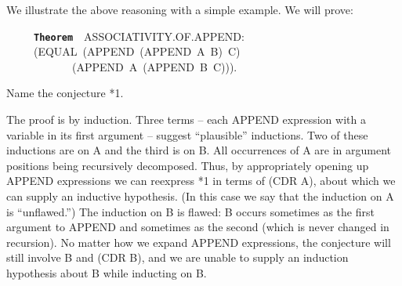 \documentclass[11pt]{book}
\newenvironment{pubasis}{\begin{flushleft}\ttfamily\small}{\normalsize\rmfamily\end{flushleft}}
\newcommand{\axiomordefinition}[1]{\vspace{6pt}\texttt{\textbf{#1}}}
\begin{document}
We illustrate the above reasoning with a simple example.
We will prove:
\begin{pubasis}
~~~~~\axiomordefinition{Theorem}~~ASSOC\-IATIV\-ITY.OF.APPEND:\\
~~~~~(EQUAL~(APPEND~(APPEND~A~B)~C)\\
~~~~~~~~~~~~(APPEND~A~(APPEND~B~C))).\\
\end{pubasis}
Name the conjecture *1.

The proof is by induction.  Three terms -- each APPEND
expression with a variable in its first argument -- suggest ``plausible''
inductions.  Two of these inductions are on A and the third is
on B.  All occurrences of A are in argument positions
being recursively decomposed.  Thus, by appropriately opening up
APPEND expressions we can reexpress *1 in terms of (CDR A),
about which we can supply an inductive hypothesis.  (In this case
we say that the induction on A is ``unflawed.'')
The induction on B is flawed:
B occurs sometimes as
the first argument to APPEND and sometimes as the second (which is never changed in recursion).  No
matter how we expand APPEND expressions, the conjecture will
still involve B and (CDR B), and we are unable to supply an
induction hypothesis about B while inducting on B.
\end{document}
